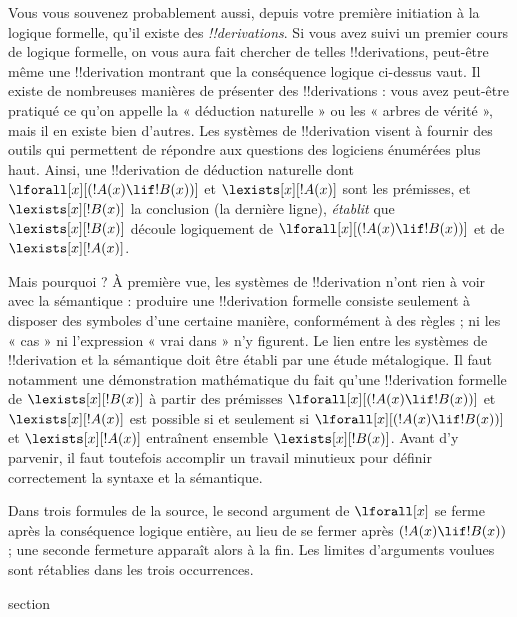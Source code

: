 \documentclass[11pt,a4paper,openany]{memoir}
\begin{document}
Vous vous souvenez probablement aussi, depuis votre première initiation
à la logique formelle, qu'il existe des \emph{!!{derivation}s}. Si vous
avez suivi un premier cours de logique formelle, on vous aura fait
chercher de telles !!{derivation}s, peut-être même une
!!{derivation} montrant que la conséquence logique ci-dessus vaut. Il
existe de nombreuses manières de présenter des !!{derivation}s : vous
avez peut-être pratiqué ce qu'on appelle la « déduction naturelle » ou
les « arbres de vérité », mais il en existe bien d'autres. Les systèmes
de !!{derivation} visent à fournir des outils qui permettent de répondre
aux questions des logiciens énumérées plus haut. Ainsi, une
!!{derivation} de déduction naturelle dont
$\lforall[x][(!A(x) \lif !B(x))]$ et $\lexists[x][!A(x)]$ sont les
prémisses, et $\lexists[x][!B(x)]$ la conclusion (la dernière ligne),
\emph{établit} que $\lexists[x][!B(x)]$ découle logiquement de
$\lforall[x][(!A(x) \lif !B(x))]$ et de $\lexists[x][!A(x)]$.

Mais pourquoi ? À première vue, les systèmes de !!{derivation} n'ont
rien à voir avec la sémantique : produire une !!{derivation} formelle
consiste seulement à disposer des symboles d'une certaine manière,
conformément à des règles ; ni les « cas » ni l'expression « vrai dans »
n'y figurent. Le lien entre les systèmes de !!{derivation} et la
sémantique doit être établi par une étude métalogique. Il faut notamment
une démonstration mathématique du fait qu'une !!{derivation} formelle de
$\lexists[x][!B(x)]$ à partir des prémisses
$\lforall[x][(!A(x) \lif !B(x))]$ et $\lexists[x][!A(x)]$ est possible
si et seulement si $\lforall[x][(!A(x) \lif !B(x))]$ et
$\lexists[x][!A(x)]$ entraînent ensemble $\lexists[x][!B(x)]$. Avant
d'y parvenir, il faut toutefois accomplir un travail minutieux pour
définir correctement la syntaxe et la sémantique.

\begin{editorial}
Dans trois formules de la source, le second argument de
$\lforall[x]$ se ferme après la conséquence logique entière, au lieu de
se fermer après $(!A(x) \lif !B(x))$ ; une seconde fermeture apparaît
alors à la fin. Les limites d'arguments voulues sont rétablies dans les
trois occurrences.
\end{editorial}


\endgroup



\begingroup
\expandafter\def\csname ol@sectioncs\endcsname{section}
\def\olfilename{syntax}
\end{document}
